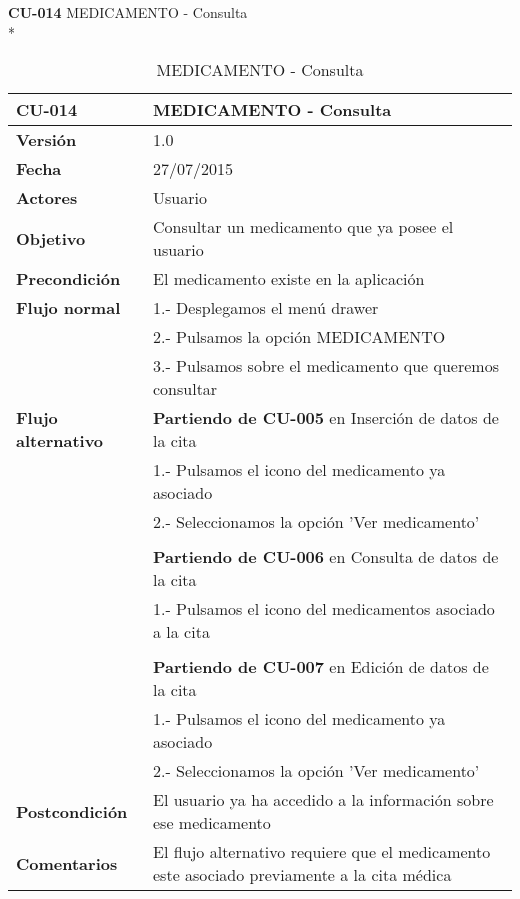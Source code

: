 \documentclass[../pfc.tex]{subfiles}
\begin{document}
		\textbf{CU-014}	MEDICAMENTO - Consulta\\*
		
		\begin{table}[H]
			\centering
			\begin{tabular}[t]{|p{3cm}|p{9.5cm}|}
				\hline \textbf{CU-014} & \textbf{MEDICAMENTO - Consulta} \\*
				\hline\hline \textbf{Versión} & 1.0 \\*
				\hline\hline \textbf{Fecha} & 27/07/2015 \\*
				\hline\textbf{Actores} 	& Usuario\\*
				\hline \textbf{Objetivo} & Consultar un medicamento que ya posee el usuario\\* 			
				\hline \textbf{Precondición} & El medicamento existe en la aplicación\\* 
				\hline \textbf{Flujo normal} & 1.- Desplegamos el menú drawer \\* 
				& 2.- Pulsamos la opción MEDICAMENTO\\*	
				& 3.- Pulsamos sobre el medicamento que queremos consultar\\*	
				\hline \textbf{Flujo alternativo} & \textbf{Partiendo de CU-005} en Inserción de datos de la cita\\* 
				& 1.- Pulsamos el icono del medicamento ya asociado\\*	
				& 2.- Seleccionamos la opción 'Ver medicamento'\\*
				& \\*
				& \textbf{Partiendo de CU-006} en Consulta de datos de la cita\\* 
				& 1.- Pulsamos el icono del medicamentos asociado a la cita\\*	
				& \\*
				& \textbf{Partiendo de CU-007} en Edición de datos de la cita\\* 
				& 1.- Pulsamos el icono del medicamento ya asociado\\*	
				& 2.- Seleccionamos la opción 'Ver medicamento'\\*
				\hline \textbf{Postcondición} & El usuario ya ha accedido a la información sobre ese medicamento \\* 
				\hline \textbf{Comentarios}   & El flujo alternativo requiere que el medicamento este asociado previamente a la cita médica\\*
				\hline
			\end{tabular}
			\caption{MEDICAMENTO - Consulta}
			\label{tabla:caso014}
		\end{table}
		
\end{document}
